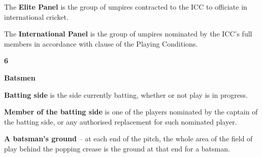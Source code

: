 \documentclass[12pt]{article}
\begin{document}
\vspace{\baselineskip}
{\fontsize{9pt}{10.8pt} \tabto{0.39in} {\fontsize{8pt}{9.6pt}\selectfont The \textbf{Elite Panel} is the group of umpires contracted to the ICC to officiate in international cricket.\par}\par}\par


\vspace{\baselineskip}
\begin{adjustwidth}{0.4in}{0.28in}
{\fontsize{9pt}{10.8pt} \tabto{0.39in} The \textbf{International Panel} is the group of umpires nominated by the ICC’s full members in accordance with clause of the Playing Conditions.\par}\par

\end{adjustwidth}


\vspace{\baselineskip}
{\fontsize{16pt}{19.2pt}\selectfont \textbf{6 \tabto{0.29in} }{\fontsize{15pt}{18.0pt}\selectfont \textbf{Batsmen}\par}\par}\par


\vspace{\baselineskip}
{\fontsize{9pt}{10.8pt} \tabto{0.39in} {\fontsize{8pt}{9.6pt}\selectfont \textbf{Batting side }is the side currently batting, whether or not play is in progress.\par}\par}\par


\vspace{\baselineskip}
\begin{adjustwidth}{0.4in}{0.49in}
{\fontsize{9pt}{10.8pt} \tabto{0.39in} \textbf{Member of the batting side }is one of the players nominated by the captain of the batting side, or any\textbf{ }authorised replacement for such nominated player.\par}\par

\end{adjustwidth}


\vspace{\baselineskip}
\begin{adjustwidth}{0.4in}{0.04in}
{\fontsize{9pt}{10.8pt} \tabto{0.39in} \textbf{A batsman’s ground }–\textbf{ }at each end of the pitch, the whole area of the field of play behind the popping crease\textbf{ }is the ground at that end for a batsman.\par}\par

\end{adjustwidth}
\end{document}
